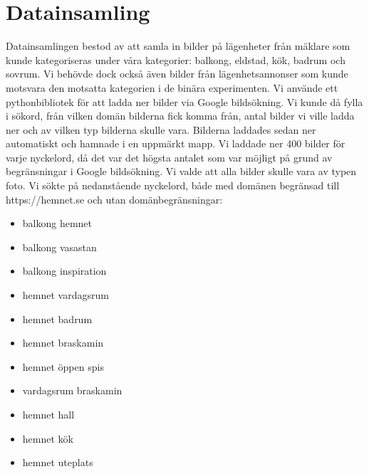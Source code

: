 \documentclass[]{kththesis}
\begin{document}
\section{Datainsamling}
Datainsamlingen bestod av att samla in bilder på lägenheter från mäklare som kunde kategoriseras under våra kategorier: balkong, eldstad, kök, badrum och sovrum. Vi behövde dock också även bilder från lägenhetsannonser som kunde motsvara den motsatta kategorien i de binära experimenten. Vi använde ett pythonbibliotek \parencite{google_image} för att ladda ner bilder via Google bildsökning. Vi kunde då fylla i sökord, från vilken domän bilderna fick komma från, antal bilder vi ville ladda ner och av vilken typ bilderna skulle vara. Bilderna laddades sedan ner automatiskt och hamnade i en uppmärkt mapp. Vi laddade ner 400 bilder för varje nyckelord, då det var det högsta antalet som var möjligt på grund av begränsningar i Google bildsökning. Vi valde att alla bilder skulle vara av typen foto. Vi sökte på nedanstående nyckelord, både med domänen begränsad till https://hemnet.se och utan domänbegränsningar:
\begin{itemize}
  \item balkong hemnet
  \item balkong vasastan
  \item balkong inspiration
  \item hemnet vardagsrum
  \item hemnet badrum
  \item hemnet braskamin
  \item hemnet öppen spis
  \item vardagsrum braskamin
  \item hemnet hall
  \item hemnet kök
  \item hemnet uteplats
\end{itemize}
\end{document}

